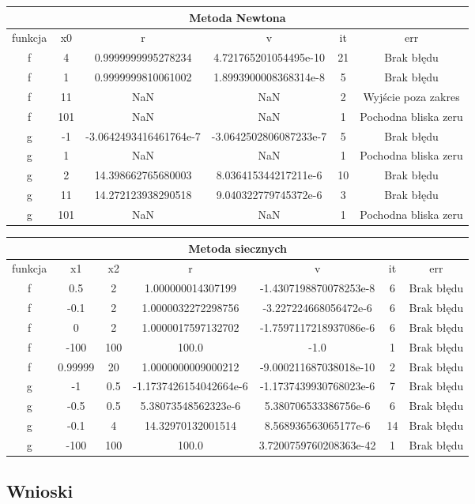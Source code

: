 \documentclass[11pt, a4paper]{article}
\begin{document}
    \begin{center}
        \begin{tabular}{|c|c|c|c|c|c|}
            \hline
            \multicolumn{6}{|c|}{Metoda Newtona}\\
            \hline
            funkcja & x0 & r & v & it & err\\
            \hline
            f & 4 & 0.9999999995278234 & 4.721765201054495e-10 & 21 & Brak błędu\\
            f & 1 & 0.9999999810061002 & 1.8993900008368314e-8 & 5 & Brak błędu\\
            f & 11 & NaN & NaN & 2 & Wyjście poza zakres\\
            f & 101 & NaN & NaN & 1 & Pochodna bliska zeru\\
            \hline
            g & -1 & -3.0642493416461764e-7 & -3.0642502806087233e-7 & 5 & Brak błędu\\
            g & 1 & NaN & NaN & 1 & Pochodna bliska zeru\\
            g & 2 & 14.398662765680003 & 8.036415344217211e-6 & 10 & Brak błędu\\
            g & 11 & 14.272123938290518 & 9.040322779745372e-6 & 3 & Brak błędu\\
            g & 101 & NaN & NaN & 1 & Pochodna bliska zeru\\
            \hline
        \end{tabular}
    \end{center}

    \begin{center}
        \begin{tabular}{|c|c|c|c|c|c|c|}
            \hline
            \multicolumn{7}{|c|}{Metoda siecznych}\\
            \hline
            funkcja & x1 & x2 & r & v & it & err\\
            \hline
            f & 0.5 & 2 & 1.000000014307199 & -1.4307198870078253e-8 & 6 & Brak błędu\\
            f & -0.1 & 2 & 1.0000032272298756 & -3.227224668056472e-6 & 6 & Brak błędu\\
            f & 0 & 2 & 1.0000017597132702 & -1.7597117218937086e-6 & 6 & Brak błędu\\
            f & -100 & 100 & 100.0 & -1.0 & 1 & Brak błędu\\
            f & 0.99999 & 20 & 1.0000000009000212 & -9.000211687038018e-10 & 2 & Brak błędu\\
            \hline
            g & -1 & 0.5 & -1.1737426154042664e-6 & -1.1737439930768023e-6 & 7 & Brak błędu\\
            g & -0.5 & 0.5 & 5.38073548562323e-6 & 5.380706533386756e-6 & 6 & Brak błędu\\
            g & -0.1 & 4 & 14.32970132001514 & 8.568936563065177e-6 & 14 & Brak błędu\\
            g & -100 & 100 & 100.0 & 3.7200759760208363e-42 & 1 & Brak błędu\\
            \hline
        \end{tabular}
    \end{center}
    \subsection{Wnioski}
\end{document}
